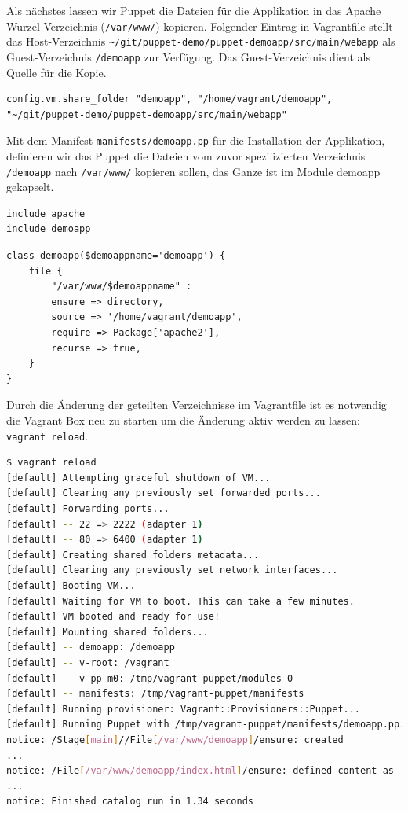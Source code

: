 \documentclass[12pt,a4paper,ngerman]{article}
\begin{document}
Als nächstes lassen wir Puppet die Dateien für die Applikation in das Apache Wurzel Verzeichnis (\lstinline$/var/www/$) kopieren. Folgender Eintrag in Vagrantfile stellt das Host-Verzeichnis \lstinline$~/git/puppet-demo/puppet-demoapp/src/main/webapp$ als Guest-Verzeichnis \lstinline$/demoapp$ zur Verfügung. Das Guest-Verzeichnis dient als Quelle für die Kopie.
\begin{lstlisting}[language=vagrant,caption=Shared folders in Vagrantfile konfigurieren, label=vagrantsharedfolder]
config.vm.share_folder "demoapp", "/home/vagrant/demoapp", "~/git/puppet-demo/puppet-demoapp/src/main/webapp"
\end{lstlisting}

Mit dem Manifest \lstinline$manifests/demoapp.pp$ für die Installation der Applikation, definieren wir das Puppet die Dateien vom zuvor spezifizierten Verzeichnis \lstinline$/demoapp$ nach \lstinline$/var/www/$ kopieren sollen, das Ganze ist im Module demoapp gekapselt.
\begin{lstlisting}[language=puppet,caption=Puppet Manifest für die Applikation, label=puppetdemoapp]
include apache
include demoapp
\end{lstlisting}

\begin{lstlisting}[language=puppet,caption=Puppet Module demoapp,label=puppet-demo-module]
class demoapp($demoappname='demoapp') {
    file {
        "/var/www/$demoappname" :
        ensure => directory,
        source => '/home/vagrant/demoapp',
        require => Package['apache2'],
        recurse => true,
    }
}
\end{lstlisting}


Durch die Änderung der geteilten Verzeichnisse im Vagrantfile ist es notwendig die Vagrant Box neu zu starten um die Änderung aktiv werden zu lassen:  \lstinline$vagrant reload$.
\begin{lstlisting}[language=sh,caption=Puppet reload mit Provisioning der Applikation, label=reloaddemoapp]
$ vagrant reload
[default] Attempting graceful shutdown of VM...
[default] Clearing any previously set forwarded ports...
[default] Forwarding ports...
[default] -- 22 => 2222 (adapter 1)
[default] -- 80 => 6400 (adapter 1)
[default] Creating shared folders metadata...
[default] Clearing any previously set network interfaces...
[default] Booting VM...
[default] Waiting for VM to boot. This can take a few minutes.
[default] VM booted and ready for use!
[default] Mounting shared folders...
[default] -- demoapp: /demoapp
[default] -- v-root: /vagrant
[default] -- v-pp-m0: /tmp/vagrant-puppet/modules-0
[default] -- manifests: /tmp/vagrant-puppet/manifests
[default] Running provisioner: Vagrant::Provisioners::Puppet...
[default] Running Puppet with /tmp/vagrant-puppet/manifests/demoapp.pp...
notice: /Stage[main]//File[/var/www/demoapp]/ensure: created
...
notice: /File[/var/www/demoapp/index.html]/ensure: defined content as '{md5}90a8d419b9c7b43b09ba73abebaf8f4c'
...
notice: Finished catalog run in 1.34 seconds
\end{lstlisting}
\end{document}

